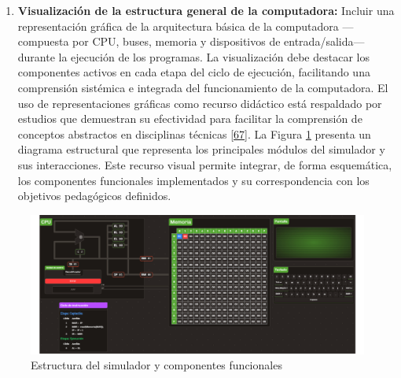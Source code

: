 \documentclass[12pt,oneside]{templates/unerthesis}
\providecommand{\tightlist}{%
  \setlength{\itemsep}{0pt}\setlength{\parskip}{0pt}}
\begin{document}
\begin{enumerate}
\def\labelenumi{\arabic{enumi}.}
\tightlist
\item
  \textbf{Visualización de la estructura general de la computadora:}
  Incluir una representación gráfica de la arquitectura básica de la computadora ---compuesta por CPU, buses, memoria y dispositivos de entrada/salida--- durante la ejecución de los programas. La visualización debe destacar los componentes activos en cada etapa del ciclo de ejecución, facilitando una comprensión sistémica e integrada del funcionamiento de la computadora. El uso de representaciones gráficas como recurso didáctico está respaldado por estudios que demuestran su efectividad para facilitar la comprensión de conceptos abstractos en disciplinas técnicas \protect\hyperlink{ref-sorva2013visualizations}{{[}67{]}}. La Figura \ref{fig:diagramasimulador} presenta un diagrama estructural que representa los principales módulos del simulador y sus interacciones. Este recurso visual permite integrar, de forma esquemática, los componentes funcionales implementados y su correspondencia con los objetivos pedagógicos definidos.
\end{enumerate}

\begin{figure}

{\centering \includegraphics[width=0.9\linewidth]{images/estructurasimulador} 

}

\caption{Estructura del simulador y componentes funcionales}\label{fig:diagramasimulador}
\end{figure}
\end{document}
